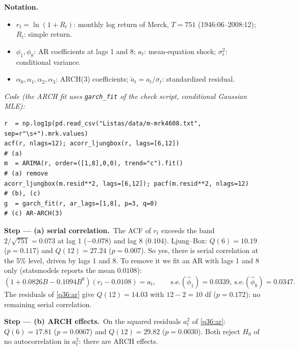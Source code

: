 \documentclass[11pt,a4paper]{article}
\newenvironment{notacao}{\par\smallskip\noindent\textbf{Notation.}\begin{itemize}[leftmargin=1.4em,topsep=1pt,itemsep=0pt]\small}{\end{itemize}}
\newcommand{\passo}[2]{\par\smallskip\noindent\textbf{Step --- #1.}~#2}
\begin{document}
\begin{sol}
\begin{notacao}
\item $r_t=\ln(1+R_t)$: monthly log return of Merck, $T=751$ (1946:06--2008:12); $R_t$: simple return.
\item $\phi_1,\phi_8$: AR coefficients at lags 1 and 8; $a_t$: mean-equation shock; $\sigma_t^2$: conditional variance.
\item $\alpha_0,\alpha_1,\alpha_2,\alpha_3$: ARCH(3) coefficients; $\tilde a_t=a_t/\sigma_t$: standardized residual.
\end{notacao}

\noindent\textit{Code (the ARCH fit uses \texttt{garch\_fit} of the check script, conditional Gaussian MLE):}
\begingroup\footnotesize
\begin{verbatim}
r  = np.log1p(pd.read_csv("Listas/data/m-mrk4608.txt", sep=r"\s+").mrk.values)
acf(r, nlags=12); acorr_ljungbox(r, lags=[6,12])                          # (a)
m  = ARIMA(r, order=([1,8],0,0), trend="c").fit()                        # (a) remove
acorr_ljungbox(m.resid**2, lags=[6,12]); pacf(m.resid**2, nlags=12)      # (b), (c)
g  = garch_fit(r, ar_lags=[1,8], p=3, q=0)                               # (c) AR-ARCH(3)
\end{verbatim}
\endgroup

\passo{(a) serial correlation}{The ACF of $r_t$ exceeds the band $2/\sqrt{751}=0.073$ at lag 1
($-0.078$) and lag 8 ($0.104$). Ljung--Box: $Q(6)=10.19$ ($p=0.117$) and $Q(12)=27.24$ ($p=0.007$). So yes,
there is serial correlation at the 5\% level, driven by lags 1 and 8. To remove it we fit an AR with lags 1
and 8 only (statsmodels reports the mean $0.0108$):}
\begin{equation}\label{q36:ar} (1+0.0826B-0.1094B^{8})(r_t-0.0108)=a_t,\qquad \text{s.e.}(\hat\phi_1)=0.0339,\ \text{s.e.}(\hat\phi_8)=0.0347 . \end{equation}
The residuals of \eqref{q36:ar} give $Q(12)=14.03$ with $12-2=10$ df ($p=0.172$): no remaining serial correlation.

\passo{(b) ARCH effects}{On the squared residuals $a_t^2$ of \eqref{q36:ar}: $Q(6)=17.81$ ($p=0.0067$) and
$Q(12)=29.82$ ($p=0.0030$). Both reject $H_0$ of no autocorrelation in $a_t^2$: there are ARCH effects.}


\end{sol}
\end{document}
